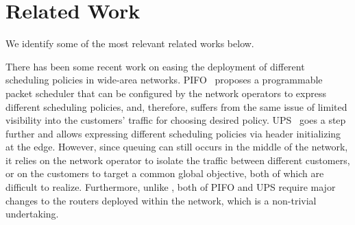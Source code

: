 \section{Related Work}
\label{s:related}

We identify some of the most relevant related works below. 

 There has been some recent work on easing the deployment of different scheduling policies in wide-area networks. PIFO~\cite{pifo} proposes a programmable packet scheduler that can be configured by the network operators to express different scheduling policies, and, therefore, suffers from the same issue of limited visibility into the customers' traffic for choosing desired policy. UPS~\cite{ups} goes a step further and allows expressing different scheduling policies via header initializing at the edge. However, since queuing can still occurs in the middle of the network, it relies on the network operator to isolate the traffic between different customers, or on the customers to target a common global objective, both of which are difficult to realize. Furthermore, unlike \name, both of PIFO and UPS require major changes to the routers deployed within the network, which is a non-trivial undertaking.




